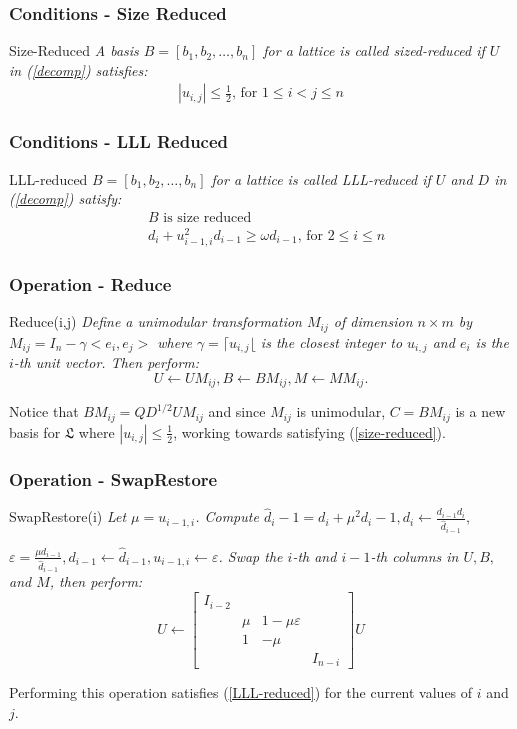 \documentclass{beamer}
\begin{document}
\begin{frame}
\frametitle{Conditions - Size Reduced}
\begin{block}{Size-Reduced}\textit{ A basis $B=[b_1,b_2,\ldots,b_n]$ for a lattice is called sized-reduced if $U$ in (\ref{decomp}) satisfies:}
\begin{eqnarray}
|u_{i,j}|\leq\frac{1}{2}\text{, for }1\leq i < j \leq n \label{size-reduced}
\end{eqnarray}
\end{block}
\end{frame}
\begin{frame}
\frametitle{Conditions - LLL Reduced}
\begin{block}{LLL-reduced} \textit{$B=[b_1,b_2,\ldots,b_n]$ for a lattice is called LLL-reduced if $U$ and $D$ in (\ref{decomp}) satisfy:}
\begin{eqnarray}
&B\text{ is size reduced}\\
&d_i+u^2_{i-1,i}d_{i-1}\geq \omega d_{i-1}\text{, for }2 \leq i \leq n \label{LLL-reduced}
\end{eqnarray}
\end{block}
\end{frame}

\begin{frame}
\frametitle{Operation - Reduce}
\begin{block}{Reduce(i,j)} \textit{Define a unimodular transformation $M_{ij}$ of dimension $n\times m$ by 
\\$M_{ij}=I_n-\gamma <e_i, e_j>$ where $\gamma=\lceil u_{i,j} \lfloor$ is the closest integer to $u_{i,j}$ and $e_i$ is the $i$-th unit vector. Then perform:}
$$U\leftarrow UM_{ij}, B\leftarrow BM_{ij}, M\leftarrow MM_{ij}.$$
\end{block}
Notice that $BM_{ij}=QD^{1/2}UM_{ij}$ and since $M_{ij}$ is unimodular, $C=BM_{ij}$ is a new basis for $\mathfrak{L}$ where $|u_{i,j}|\leq \frac{1}{2}$, working towards satisfying (\ref{size-reduced}).
\end{frame}

\begin{frame}
\frametitle{Operation - SwapRestore}
\begin{block}{SwapRestore(i)} \textit{Let $\mu=u_{i-1,i}$. Compute $\hat{d}_i-1=d_i+\mu^2 d_i-1, d_i\leftarrow \frac{d_{i-1}d_i}{\hat{d}_{i-1}},$}

\textit{$\varepsilon=\frac{\mu d_{i-1}}{\hat{d}_{i-1}},d_{i-1}\leftarrow \hat{d}_{i-1}, u_{i-1,i}\leftarrow \varepsilon$. Swap the $i$-th and $i-1$-th columns in $U,B,$ and $M$, then perform:}
$$U \leftarrow \left[
\begin{array}{cccc}
I_{i-2} & & &\\
&\mu & 1-\mu \varepsilon &\\
&1   &  -\mu &\\
& & & I_{n-i}
\end{array}\right]U $$
\end{block}
Performing this operation satisfies (\ref{LLL-reduced}) for the current values of $i$ and $j$.
\end{frame}
\end{document}
